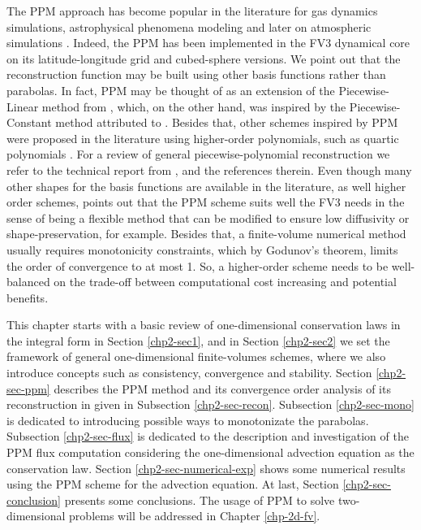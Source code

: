 The PPM approach has become popular in the literature for gas 
dynamics simulations, astrophysical phenomena modeling \citep{woodward:1986}
and later on atmospheric simulations \citep{carpenter:1990}.
Indeed, the PPM has been implemented in the FV3 dynamical core on its 
latitude-longitude grid \citep{lin:2004} and cubed-sphere \citep{putman:2007}
versions.
We point out that the reconstruction function may be built using other basis 
functions rather than parabolas. In fact, PPM may be thought of as an extension of 
the Piecewise-Linear method from \citet{vanleer:1977}, which, on the other hand,
was inspired by the Piecewise-Constant method attributed to \citet{godunov:1959}.
Besides that, other schemes inspired by PPM were proposed in the literature using
higher-order polynomials, such as quartic polynomials \citep{white:2008}.
For a review of general piecewise-polynomial reconstruction we refer 
to the technical report from \citet{engwirda:2016}, \citet{lauritzen:2011}
and the references therein.
Even though many other shapes for the basis functions are available in the 
literature, as well higher order schemes, \citet{harris:2021} points out that the PPM
scheme suits well the FV3 needs in the sense of being a flexible method 
that can be modified to ensure low diffusivity or shape-preservation, for example.
Besides that, a finite-volume numerical method usually requires
monotonicity constraints, which by Godunov's theorem, limits 
the order of convergence to at most 1.
So, a higher-order scheme needs to be well-balanced on the trade-off between 
computational cost increasing and potential benefits.


This chapter starts with a basic review of one-dimensional conservation laws in
the integral form in Section \ref{chp2-sec1}, and in Section \ref{chp2-sec2} 
we set the framework of general one-dimensional finite-volumes schemes,
where we also introduce concepts such as consistency, convergence and stability.
Section \ref{chp2-sec-ppm} describes the PPM method and its convergence order analysis
of its reconstruction in given in Subsection \ref{chp2-sec-recon}.
Subsection \ref{chp2-sec-mono} is dedicated to introducing possible ways to monotonizate
the parabolas.
Subsection \ref{chp2-sec-flux} is dedicated to the description and investigation of the PPM flux
computation considering the one-dimensional advection equation as the conservation law.
Section \ref{chp2-sec-numerical-exp} shows some numerical results using the PPM scheme
for the advection equation.  At last, Section \ref{chp2-sec-conclusion} presents
some conclusions.
The usage of PPM to solve two-dimensional problems
will be addressed in Chapter \ref{chp-2d-fv}.

